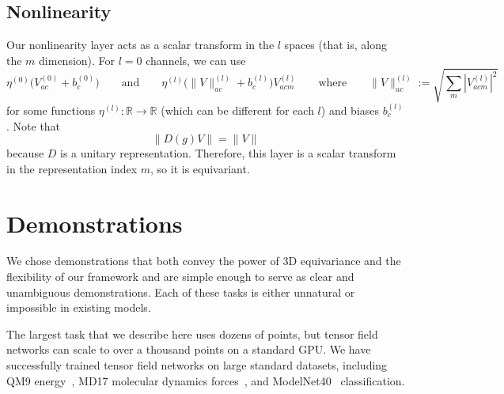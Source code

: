 \documentclass{article}
\begin{document}
\subsection{Nonlinearity}

Our nonlinearity layer acts as a scalar transform in the $l$ spaces (that is, along the $m$ dimension).  
For $l=0$ channels, we can use \[\eta^{(0)}\big(V^{(0)}_{ac} + b^{(0)}_c\big) \qquad \text{and}\qquad \eta^{(l)}\big(\|V\|^{(l)}_{ac} + b^{(l)}_c \big)V^{(l)}_{acm} \qquad \text{where} \qquad \|V\|^{(l)}_{ac} := \sqrt{\sum_m |V^{(l)}_{acm}|^2}\] for some functions $\eta^{(l)} : \mathbb{R} \rightarrow \mathbb{R}$ (which can be different for each $l$) and biases $b^{(l)}_c$. 
Note that \[\|D(g)V\| = \|V\|\] because $D$ is a unitary representation.  Therefore, this layer is a scalar transform in the representation index $m$, so it is equivariant.



\section{Demonstrations}
  
We chose demonstrations that both convey the power of 3D equivariance and the flexibility of our framework and are simple enough to serve as clear and unambiguous demonstrations.  Each of these tasks is either unnatural or impossible in existing models.

The largest task that we describe here uses dozens of points, but tensor field networks can scale to over a thousand points on a standard GPU.  We have successfully trained tensor field networks on large standard datasets, including QM9 energy~\cite{QM9ramakrishnan2014quantum}, MD17 molecular dynamics forces~\cite{Chmielae1603015}, and ModelNet40~\cite{DBLP:conf/cvpr/WuSKYZTX15} classification.
 
\end{document}
